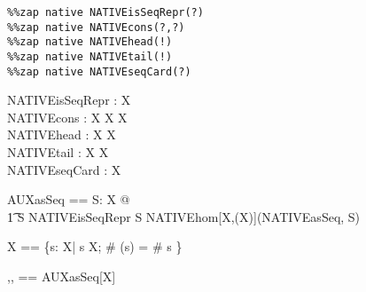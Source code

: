 \documentclass{article}
\begin{document}

\begin{verbatim}
%%zap native NATIVEisSeqRepr(?)
%%zap native NATIVEcons(?,?)
%%zap native NATIVEhead(!)
%%zap native NATIVEtail(!)
%%zap native NATIVEseqCard(?)
\end{verbatim}

\begin{axdef}[X]
  NATIVEisSeqRepr : \assumed \power X \\
  NATIVEcons : \assumed X \cross \seq X \fun \seq X \\
  NATIVEhead : \assumed \seq X \pfun X \\
  NATIVEtail : \assumed \seq X \pfun \seq X \\
  NATIVEseqCard : \assumed \power X \pfun \nat
\end{axdef}



\begin{axdef}[X]
  AUXasSeq == 
    \lambda S: \assumed \seq X @ \\\t1
      \IF S \in NATIVEisSeqRepr \THEN S
      \ELSE NATIVEhom[\nat \cross X,\power(\nat \cross X)](NATIVEasSeq, S)
\end{axdef}




\begin{zed}
  \iseq X == \{s: \seq X| s \in \seq X; \# (\ran s) = \# s \}
\end{zed}



\begin{axdef}[X]
  \langle ,, \rangle == AUXasSeq[X]
\end{axdef}

\end{document}
